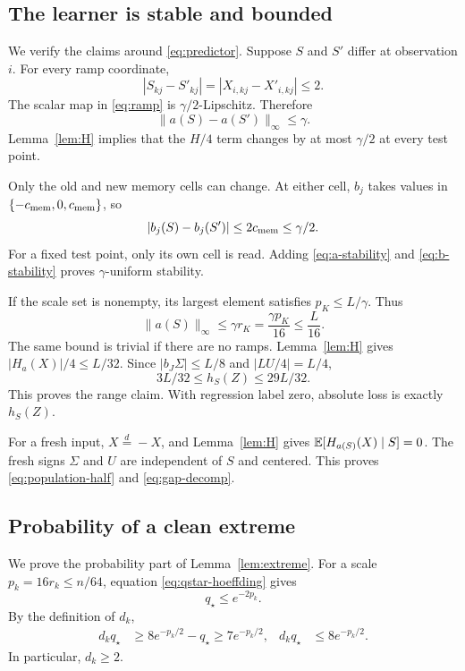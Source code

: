 \subsection{The learner is stable and bounded}\label{app:stable}

We verify the claims around \eqref{eq:predictor}. Suppose $S$ and $S'$ differ at observation $i$.
For every ramp coordinate,
\[
 |S_{kj}-S'_{kj}|=|X_{i,kj}-X'_{i,kj}|\le2.
\]
The scalar map in \eqref{eq:ramp} is $\gamma/2$-Lipschitz. Therefore
\begin{equation}
 \|a(S)-a(S')\|_\infty\le\gamma.
 \label{eq:a-stability}
\end{equation}
Lemma~\ref{lem:H} implies that the $H/4$ term changes by at most $\gamma/2$ at every test point.

Only the old and new memory cells can change. At either cell, $b_j$ takes values in
$\{-c_{\rm mem},0,c_{\rm mem}\}$, so
\begin{equation}
 |b_j(S)-b_j(S')|\le2c_{\rm mem}\le\gamma/2.
 \label{eq:b-stability}
\end{equation}
For a fixed test point, only its own cell is read. Adding \eqref{eq:a-stability} and
\eqref{eq:b-stability} proves $\gamma$-uniform stability.

If the scale set is nonempty, its largest element satisfies $p_K\le L/\gamma$. Thus
\begin{equation}
 \|a(S)\|_\infty\le\gamma r_K=\frac{\gamma p_K}{16}\le\frac L{16}.
 \label{eq:a-range}
\end{equation}
The same bound is trivial if there are no ramps. Lemma~\ref{lem:H} gives
$|H_a(X)|/4\le L/32$. Since $|b_J\Sigma|\le L/8$ and $|LU/4|=L/4$,
\[
 3L/32\le h_S(Z)\le29L/32.
\]
This proves the range claim. With regression label zero, absolute loss is exactly $h_S(Z)$.

For a fresh input, $X\overset{d}{=}-X$, and Lemma~\ref{lem:H} gives
$\mathbb E[H_{a(S)}(X)\mid S]=0$. The fresh signs $\Sigma$ and $U$ are independent of $S$ and centered.
This proves \eqref{eq:population-half} and \eqref{eq:gap-decomp}.

\subsection{Probability of a clean extreme}\label{app:extreme}

We prove the probability part of Lemma~\ref{lem:extreme}. For a scale $p_k=16r_k\le n/64$,
equation \eqref{eq:qstar-hoeffding} gives
\begin{equation}
 q_\star\le e^{-2p_k}.
 \label{eq:qstar-small}
\end{equation}
By the definition of $d_k$,
\begin{align}
 d_kq_\star
 &\ge 8e^{-p_k/2}-q_\star
 \ge7e^{-p_k/2},
 &d_kq_\star&\le8e^{-p_k/2}.
 \label{eq:lambda-bracket}
\end{align}
In particular, $d_k\ge2$.

